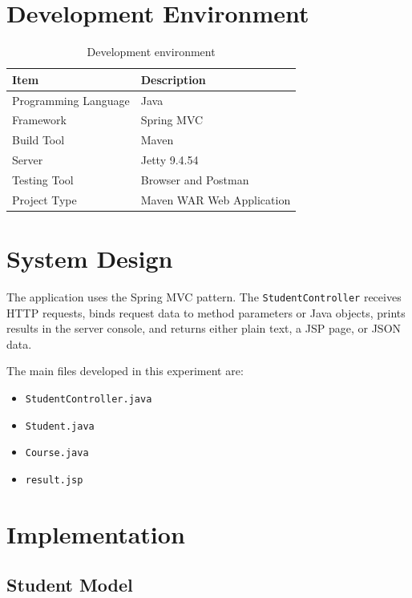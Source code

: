 \documentclass[12pt,a4paper]{article}
\begin{document}
\section{Development Environment}

\begin{table}[H]
    \centering
    \begin{tabular}{|l|l|}
        \hline
        \textbf{Item} & \textbf{Description} \\
        \hline
        Programming Language & Java \\
        Framework & Spring MVC \\
        Build Tool & Maven \\
        Server & Jetty 9.4.54 \\
        Testing Tool & Browser and Postman \\
        Project Type & Maven WAR Web Application \\
        \hline
    \end{tabular}
    \caption{Development environment}
\end{table}

\section{System Design}

The application uses the Spring MVC pattern. The \texttt{StudentController} receives HTTP
requests, binds request data to method parameters or Java objects, prints results in the server
console, and returns either plain text, a JSP page, or JSON data.

The main files developed in this experiment are:

\begin{itemize}
    \item \texttt{StudentController.java}
    \item \texttt{Student.java}
    \item \texttt{Course.java}
    \item \texttt{result.jsp}
\end{itemize}

\section{Implementation}

\subsection{Student Model}
\end{document}
